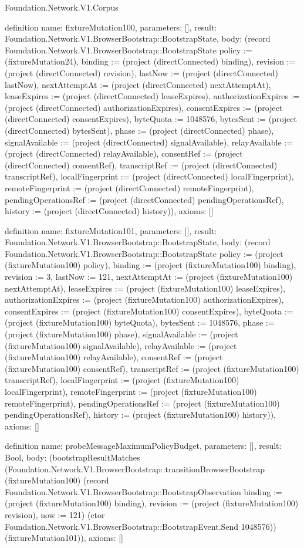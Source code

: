 \begin{lexlean}{Foundation.Network.V1.Corpus}
\begin{semanticmodule}
definition{
  name: fixtureMutation100,
  parameters: [],
  result: Foundation.Network.V1.BrowserBootstrap::BootstrapState,
  body: (record Foundation.Network.V1.BrowserBootstrap::BootstrapState {policy := (fixtureMutation24), binding := (project (directConnected) binding), revision := (project (directConnected) revision), lastNow := (project (directConnected) lastNow), nextAttemptAt := (project (directConnected) nextAttemptAt), leaseExpires := (project (directConnected) leaseExpires), authorizationExpires := (project (directConnected) authorizationExpires), consentExpires := (project (directConnected) consentExpires), byteQuota := 1048576, bytesSent := (project (directConnected) bytesSent), phase := (project (directConnected) phase), signalAvailable := (project (directConnected) signalAvailable), relayAvailable := (project (directConnected) relayAvailable), consentRef := (project (directConnected) consentRef), transcriptRef := (project (directConnected) transcriptRef), localFingerprint := (project (directConnected) localFingerprint), remoteFingerprint := (project (directConnected) remoteFingerprint), pendingOperationsRef := (project (directConnected) pendingOperationsRef), history := (project (directConnected) history)}),
  axioms: []
}

definition{
  name: fixtureMutation101,
  parameters: [],
  result: Foundation.Network.V1.BrowserBootstrap::BootstrapState,
  body: (record Foundation.Network.V1.BrowserBootstrap::BootstrapState {policy := (project (fixtureMutation100) policy), binding := (project (fixtureMutation100) binding), revision := 3, lastNow := 121, nextAttemptAt := (project (fixtureMutation100) nextAttemptAt), leaseExpires := (project (fixtureMutation100) leaseExpires), authorizationExpires := (project (fixtureMutation100) authorizationExpires), consentExpires := (project (fixtureMutation100) consentExpires), byteQuota := (project (fixtureMutation100) byteQuota), bytesSent := 1048576, phase := (project (fixtureMutation100) phase), signalAvailable := (project (fixtureMutation100) signalAvailable), relayAvailable := (project (fixtureMutation100) relayAvailable), consentRef := (project (fixtureMutation100) consentRef), transcriptRef := (project (fixtureMutation100) transcriptRef), localFingerprint := (project (fixtureMutation100) localFingerprint), remoteFingerprint := (project (fixtureMutation100) remoteFingerprint), pendingOperationsRef := (project (fixtureMutation100) pendingOperationsRef), history := (project (fixtureMutation100) history)}),
  axioms: []
}

definition{
  name: probeMessageMaximumPolicyBudget,
  parameters: [],
  result: Bool,
  body: (bootstrapResultMatches (Foundation.Network.V1.BrowserBootstrap::transitionBrowserBootstrap (fixtureMutation100) (record Foundation.Network.V1.BrowserBootstrap::BootstrapObservation {binding := (project (fixtureMutation100) binding), revision := (project (fixtureMutation100) revision), now := 121}) (ctor Foundation.Network.V1.BrowserBootstrap::BootstrapEvent.Send 1048576)) (fixtureMutation101)),
  axioms: []
}


\end{semanticmodule}
\end{lexlean}
